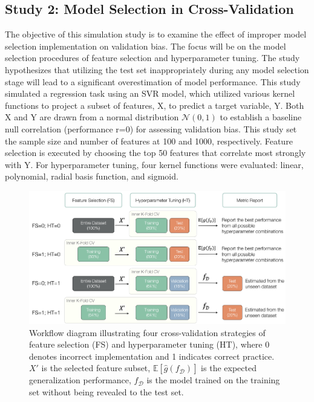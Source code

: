 \subsection{Study 2: Model Selection in Cross-Validation}

The objective of this simulation study is to examine the effect of improper model selection implementation on validation bias. The focus will be on the model selection procedures of feature selection and hyperparameter tuning. The study hypothesizes that utilizing the test set inappropriately during any model selection stage will lead to a significant overestimation of model performance. This study simulated a regression task using an SVR model, which utilized various kernel functions to project a subset of features, X, to predict a target variable, Y. Both X and Y are drawn from a normal distribution $\mathcal{N}(0, 1)$ to establish a baseline null correlation (performance r=0) for assessing validation bias. This study set the sample size and number of features at 100 and 1000, respectively. Feature selection is executed by choosing the top 50 features that correlate most strongly with Y. For hyperparameter tuning, four kernel functions were evaluated: linear, polynomial, radial basis function, and sigmoid.
\begin{figure}[h]
    \centering
    \includegraphics[width=1\textwidth]{fig_s2_schemes.jpg}
    \caption{Workflow diagram illustrating four cross-validation  strategies of feature selection (FS) and hyperparameter tuning (HT), where 0 denotes incorrect implementation and 1 indicates correct practice. $X'$ is the selected feature subset, $\mathbb{E}[\hat{g}(f_\mathcal{D})]$ is the expected generalization performance, $f_\mathcal{D}$ is the model trained on the training set without being revealed to the test set.}
    \label{fig:s2_schemes}
\end{figure}

